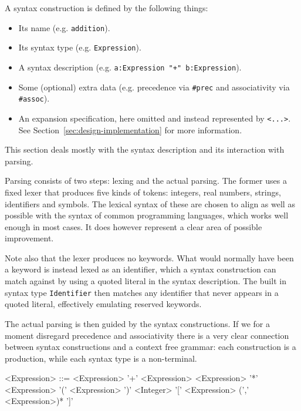 \documentclass{kththesis}
\begin{document}
A syntax construction is defined by the following things:
\begin{itemize}
  \item Its name (e.g. \texttt{addition}).
  \item Its syntax type (e.g. \texttt{Expression}).
  \item A syntax description (e.g. \texttt{a:Expression "+" b:Expression}).
  \item Some (optional) extra data (e.g. precedence via \texttt{#prec} and associativity via \texttt{#assoc}).
  \item An expansion specification, here omitted and instead represented by \texttt{<...>}. See Section~\ref{sec:design-implementation} for more information.
\end{itemize}

This section deals mostly with the syntax description and its interaction with parsing.

Parsing consists of two steps: lexing and the actual parsing. The former uses a fixed lexer that produces five kinds of tokens: integers, real numbers, strings, identifiers and symbols. The lexical syntax of these are chosen to align as well as possible with the syntax of common programming languages, which works well enough in most cases. It does however represent a clear area of possible improvement.

Note also that the lexer produces no keywords. What would normally have been a keyword is instead lexed as an identifier, which a syntax construction can match against by using a quoted literal in the syntax description. The built in syntax type \texttt{Identifier} then matches any identifier that never appears in a quoted literal, effectively emulating reserved keywords.

The actual parsing is then guided by the syntax constructions. If we for a moment disregard precedence and associativity there is a very clear connection between syntax constructions and a context free grammar: each construction is a production, while each syntax type is a non-terminal.

\setlength{\grammarindent}{8em}
\begin{grammar}
<Expression> ::= <Expression> '+' <Expression>
  \alt <Expression> '*' <Expression>
  \alt '(' <Expression> ')'
  \alt <Integer>
  \alt '[' <Expression> (',' <Expression>)* ']'
\end{grammar}
\end{document}

